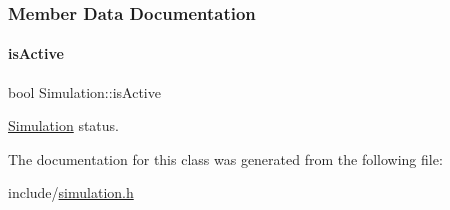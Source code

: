 \subsubsection{Member Data Documentation}
\mbox{\label{classSimulation_ad76dc6e6d56b95b074f3824340f91a4c}} 
\paragraph{\texorpdfstring{isActive}{isActive}}
{\footnotesize\ttfamily bool Simulation\+::is\+Active\hspace{0.3cm}{\ttfamily [private]}}



\mbox{\hyperlink{classSimulation}{Simulation}} status. 



The documentation for this class was generated from the following file\+:\begin{DoxyCompactItemize}
\item 
include/\mbox{\hyperlink{simulation_8h}{simulation.\+h}}\end{DoxyCompactItemize}
